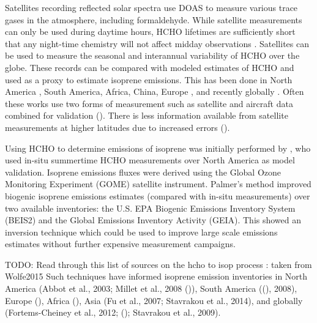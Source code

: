   Satellites recording reflected solar spectra use DOAS to measure various trace gases in the atmosphere, including formaldehyde. 
  While satellite measurements can only be used during daytime hours, HCHO lifetimes are sufficiently short that any night-time chemistry will not affect midday observations \citep{Wolfe2016}.
  Satellites can be used to measure the seasonal and interannual variability of HCHO over the globe.
  These records can be compared with modeled estimates of HCHO and used as a proxy to estimate isoprene emissions.
  This has been done in North America \citep{Palmer2003, Millet2006}, South America, Africa, China, Europe \citep{Dufour2009}, and recently globally \citep{FortemsCheiney2012, Bauwens2016}.
  Often these works use two forms of measurement such as satellite and aircraft data combined for validation (\cite{Marais2014}).
  There is less information available from satellite measurements at higher latitudes due to increased errors (\cite{DeSmedt2015}).
  
  Using HCHO to determine emissions of isoprene was initially performed by \cite{Palmer2001, Palmer2003}, who used in-situ summertime HCHO measurements over North America as model validation.
  Isoprene emissions fluxes were derived using the Global Ozone Monitoring Experiment (GOME) satellite instrument.
  Palmer's method improved biogenic isoprene emissions estimates (compared with in-situ measurements) over two available inventories: the U.S. EPA Biogenic Emissions Inventory System (BEIS2) and the Global Emissions Inventory Activity (GEIA).
  This showed an inversion technique which could be used to improve large scale emissions estimates without further expensive measurement campaigns.
  
  TODO: Read through this list of sources on the hcho to isop process : taken from Wolfe2015
  Such techniques have informed isoprene emission inventories in North America (Abbot et al., 2003; Millet et al., 2008 (\cite{Palmer2003,Millet2006,Palmer2006})), South America ((\cite{Barkley2013}), 2008), Europe (\cite{Curci2010,Dufour2009}), Africa (\cite{Marais2012}), Asia (Fu et al., 2007; Stavrakou et al., 2014), and globally (Fortems-Cheiney et al., 2012; (\cite{Shim2005}); Stavrakou et al., 2009).
  
